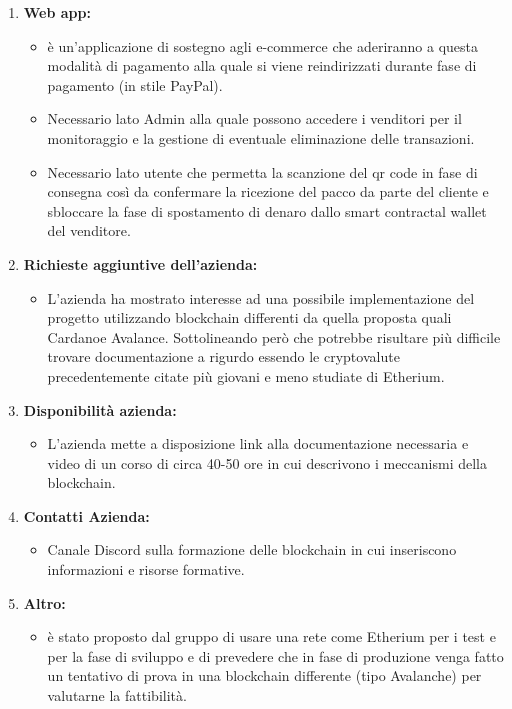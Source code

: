 \begin{enumerate}
	\item \textbf{Web app:}
	\begin{itemize}
		\item è un'applicazione di sostegno agli e-commerce che aderiranno a questa modalità di pagamento alla quale si viene reindirizzati durante fase di pagamento (in stile PayPal).
		\item Necessario lato Admin alla quale possono accedere i venditori per il monitoraggio e la gestione di eventuale eliminazione delle transazioni. 
		\item Necessario lato utente che permetta la scanzione del qr code in fase di consegna così da confermare la ricezione del pacco da parte del cliente e sbloccare la fase di spostamento di denaro dallo smart contract\glo al wallet del venditore.
	\end{itemize}

	\item \textbf{Richieste aggiuntive dell'azienda:}
	\begin{itemize}
		\item L'azienda ha mostrato interesse ad una possibile implementazione del progetto utilizzando blockchain differenti da quella proposta quali Cardano\glo e Avalance\glo.
		 Sottolineando però che potrebbe risultare più difficile trovare documentazione a rigurdo essendo le cryptovalute precedentemente citate più giovani e meno studiate di Etherium\glo.
	\end{itemize}

	\item \textbf{Disponibilità azienda:}
	\begin{itemize}
		\item L'azienda mette a disposizione link alla documentazione necessaria e video di un corso di circa 40-50 ore in cui descrivono i meccanismi della blockchain.
		
	\end{itemize}

	\item \textbf{Contatti Azienda:}
	\begin{itemize}
		\item Canale Discord sulla formazione delle blockchain in cui inseriscono informazioni e risorse formative.
	\end{itemize}

	\item \textbf{Altro:}
	\begin{itemize}
		\item è stato proposto dal gruppo di usare una rete come Etherium per i test e per la fase di sviluppo e di prevedere che in fase di produzione venga fatto un tentativo di prova in una blockchain differente (tipo Avalanche) per valutarne la fattibilità.
	\end{itemize}

\end{enumerate}

